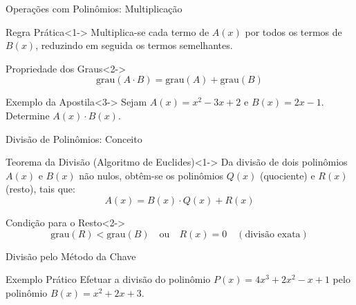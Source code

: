 \documentclass[10pt, aspectratio=169]{beamer}
\begin{document}
\begin{frame}{Operações com Polinômios: Multiplicação}
  \begin{block}{Regra Prática}<1->
    Multiplica-se cada termo de $A(x)$ por todos os termos de $B(x)$, reduzindo em seguida os termos semelhantes.
  \end{block}

  \pause

  \begin{alertblock}{Propriedade dos Graus}<2->
    \[
      \text{grau}(A \cdot B) = \text{grau}(A) + \text{grau}(B)
    \]
  \end{alertblock}

  \pause

  \begin{exampleblock}{Exemplo da Apostila}<3->
    Sejam $A(x) = x^2 - 3x + 2$ e $B(x) = 2x - 1$. Determine $A(x) \cdot B(x)$.
  \end{exampleblock}
\end{frame}

\begin{frame}{Divisão de Polinômios: Conceito}
  \begin{block}{Teorema da Divisão (Algoritmo de Euclides)}<1->
    Da divisão de dois polinômios $A(x)$ e $B(x)$ não nulos, obtêm-se os polinômios $Q(x)$ (quociente) e $R(x)$ (resto), tais que:
    \[
      A(x) = B(x) \cdot Q(x) + R(x)
    \]
  \end{block}

  \pause

  \begin{alertblock}{Condição para o Resto}<2->
    \[
      \text{grau}(R) < \text{grau}(B) \quad \text{ou} \quad R(x) = 0 \quad (\text{divisão exata})
    \]
  \end{alertblock}
\end{frame}

\begin{frame}{Divisão pelo Método da Chave}
  \begin{exampleblock}{Exemplo Prático}
    Efetuar a divisão do polinômio $P(x) = 4x^3 + 2x^2 - x + 1$ pelo polinômio $B(x) = x^2 + 2x + 3$.
  \end{exampleblock}


\end{frame}
\end{document}
